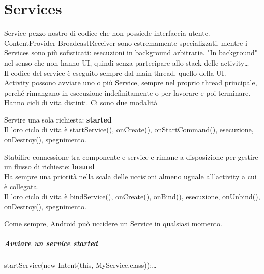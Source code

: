 \documentclass[10pt]{book}
\begin{document}
\chapter{Services}
Service pezzo nostro di codice che non possiede interfaccia utente. ContentProvider BroadcastReceiver sono estremamente specializzati, mentre i Services sono più sofisticati: esecuzioni in background arbitrarie. "In background" nel senso che non hanno UI, quindi senza partecipare allo stack delle activity\ldots\\
Il codice del service è eseguito sempre dal main thread, quello della UI.\\
Activity possono avviare uno o più Service, sempre nel proprio thread principale, perché rimangano in esecuzione indefinitamente o per lavorare e poi terminare.\\
Hanno cicli di vita distinti. Ci sono due modalità
\begin{list}{}{}
	\item Servire una sola richiesta: \textbf{started}\\
	Il loro ciclo di vita è startService(), onCreate(), onStartCommand(), esecuzione, onDestroy(), spegnimento.
	\item Stabilire connessione tra componente e service e rimane a disposizione per gestire un flusso di richieste: \textbf{bound}\\
	Ha sempre una priorità nella scala delle uccisioni almeno uguale all'activity a cui è collegata.\\
	Il loro ciclo di vita è bindService(), onCreate(), onBind(), esecuzione, onUnbind(), onDestroy(), spegnimento.
\end{list}
Come sempre, Android può uccidere un Service in qualsiasi momento.
\paragraph{Avviare un service started} startService(new Intent(this, MyService.class));\ldots
\end{document}
